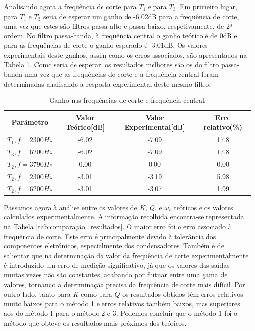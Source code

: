 Analisando agora a frequência de corte para $T_1$ e para $T_3$. Em primeiro lugar, para $T_1$ e $T_3$ seria de esperar um ganho de -6.02dB para a frequência de corte, uma vez que estes são filtros passa-alto e passa-baixo, respetivamente, de 2ª ordem. No filtro passa-banda, à frequência central o ganho teórico é de 0dB e para as frequências de corte o ganho esperado é -3.01dB. Os valores experimentais deste ganhos, assim como os erros associados, são apresentados na Tabela \ref{tab:db_erros}. Como seria de esperar, os resultados melhores são os do filtro passa-banda uma vez que as frequências de corte e a frequência central foram determinadas analisando a resposta experimental deste mesmo filtro.

\begin{table}[ht]
\caption{Ganho nas frequências de corte e frequência central.}
    \centering
    \begin{tabular}{cccc}
    \hline
        Parâmetro & Valor Teórico[dB] & Valor Experimental[dB] & Erro relativo(\%)  \\
        \hline
         $T_1, f=2300 Hz$ & -6.02 & -7.09 & 17.8 \\
         $T_3, f=6200 Hz$ & -6.02 & -7.09 & 17.8 \\
         $T_2, f=3790 Hz$ & 0.00 & 0.00 & 0.00 \\
          $T_2, f=2300 Hz$ & -3.01 & -3.19 & 5.98 \\
           $T_2, f=6200 Hz$ & -3.01 & -3.07 & 1.99 \\
           \hline
    \end{tabular}
    
    \label{tab:db_erros}
\end{table}
\par

Passamos agora à análise entre os valores de $K$, $Q$, e $\omega_o$ teóricos e os valores calculados experimentalmente. A informação recolhida encontra-se representada na Tabela \ref{tab:comparação_resultados}. O maior erro foi o erro associado à frequência de corte. Este erro é principalmente devido à tolerância dos componentes eletrónicos, especialmente dos condensadores. Também é de salientar que na determinação do valor da frequência de corte experimentalmente é introduzido um erro de medição significativo, já que os valores das saídas muitas vezes não são constantes, acabando por flutuar entre uma gama de valores, tornando a determinação precisa da frequência de corte mais difícil. Por outro lado, tanto para $K$ como para $Q$ os resultados obtidos têm erros relativos muito baixos para o método 1 e erros relativos também baixos, mas superiores aos do método 1 para o método 2 e 3. Podemos concluir que o método 1 foi o método que obteve os resultados mais próximos dos teóricos.

